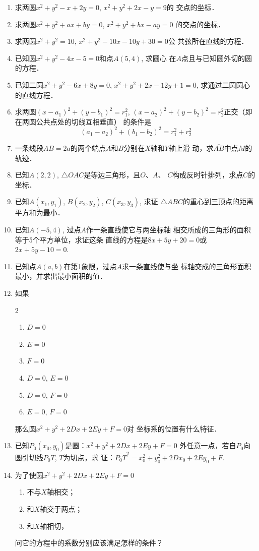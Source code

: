 \begin{enumerate}
\item 求两圆$x^2+y^2-x+2y=0$, $x^2+y^2+2x-y=9$的
交点的坐标．
\item 求两圆$x^2+y^2+ax+by=0$, $x^2+y^2+bx-ay=0$
的交点的坐标．
\item 求两圆$x^2+y^2=10$, $x^2+y^2-10x-10y+30=0$公
共弦所在直线的方程．
\item 已知圆$x^2+y^2-4x-5=0$和点$A(5,4)$, 求圆心
在$A$点且与已知圆外切的圆的方程．
\item 已知二圆$x^2+y^2-6x+8y=0$, $x^2+y^2+2x-12y
+1=0$, 求通过二圆圆心的直线方程．
\item 求两圆$(x-a_1)^2+(y-b_1)^2=r^2_1$, $(x-a_2)^2+(y-
b_2)^2=r^2_2$正交（即在两圆公共点处的切线互相垂直）
的条件是
\[(a_1-a_2)^2+(b_1-b_2)^2=r_1^2+r_2^2\]
\item 一条线段$AB=2a$的两个端点$A$和$B$分别在$X$轴和$Y$轴上滑
动，求$\overline{AB}$中点$M$的轨迹．
\item 已知$A(2,2)$, $\triangle OAC$是等边三角形，且$O$、$A$、
$C$构成反时针排列，求点$C$的坐标．
\item 已知$A(x_1,y_1)$, $B(x_2,y_2)$, $C(x_3,y_3)$, 求证
$\triangle ABC$的重心到三顶点的距离平方和为最小．
\item 已知$A(-5,4)$, 过点$A$作一条直线使它与两坐标轴
相交所成的三角形的面积等于5个平方单位，求证这条
直线的方程是$8x+5y+20=0$或$2x+5y-10=0$.
\item 已知点$A(a,b)$在第1象限，过点$A$求一条直线使与坐
标轴交成的三角形面积最小，并求出最小面积的值．

\item 如果
\begin{multicols}{2}
    \begin{enumerate}
        \item $D=0$
        \item $E=0$
        \item $F=0$
        \item $D=0$, $E=0$
        \item $D=0$, $F=0$
        \item $E=0$, $F=0$
    \end{enumerate}
\end{multicols}
那么圆$x^2+y^2+2Dx+2Ey+F=0$对
坐标系的位置有什么特征．
\item 已知$P_0(x_0,y_0)$是圆：$x^2+y^2+2Dx+2Ey+F=0$
外任意一点，若自$P_0$向圆引切线$P_0T$, $T$为切点，求
证：$\overline{P_0T}^2=x_0^2+y_0^2+2Dx_0+2Ey_0+F$.
\item 为了使圆$x^2+y^2+2Dx+2Ey+F=0$
\begin{enumerate}
\item 不与$X$轴相交；    
\item 和$X$轴交于两点；    
\item 和$X$轴相切，
\end{enumerate}
问它的方程中的系数分别应该满足怎样的条件？


\end{enumerate}
